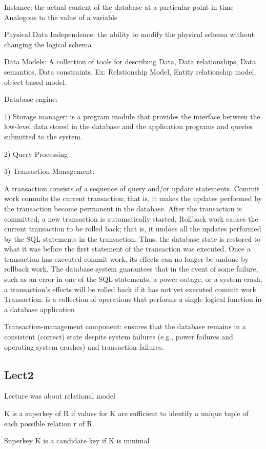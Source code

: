 \documentclass[8pt, a4paper, oneside, twocolumn]{extarticle}
\begin{document}
Instance: the actual content of the database at a particular point in time 
Analogous to the value of a variable

Physical Data Independence: the ability to modify the physical schema without 
changing the logical schema

Data Models: A collection of tools for describing Data, Data relationships, Data semantics, Data constraints. Ex: Relationship Model, Entity relationship model, object based model.

Database engine: 

1) Storage manager: is a program module that provides the interface between 
the low-level data stored in the database and the application programs and 
queries submitted to the system.

2) Query Processing

3) Transaction Management:- 

A transaction consists of a sequence of query and/or update statements.
Commit work commits the current transaction; that is, it makes the updates
performed by the transaction become permanent in the database. After the
transaction is committed, a new transaction is automatically started.
Rollback work causes the current transaction to be rolled back; that is, it
undoes all the updates performed by the SQL statements in the transaction.
Thus, the database state is restored to what it was before the first statement
of the transaction was executed.
Once a transaction has executed commit work, its
effects can no longer be undone by rollback work. The database system guarantees that in the event of some failure, such as an error in one of the SQL statements,
a power outage, or a system crash, a transaction’s effects will be rolled back if it
has not yet executed commit work
Transaction: is a collection of operations that performs a single 
logical function in a database application

Transaction-management component: ensures that the database 
remains in a consistent (correct) state despite system failures (e.g., 
power failures and operating system crashes) and transaction failures.
\subsection{Lect2}
Lecture was about relational model

K is a superkey of R if values for K are sufficient to identify a unique tuple of each possible relation r of R.

Superkey K is a candidate key if K is minimal
\end{document}
